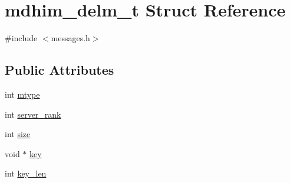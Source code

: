 \hypertarget{structmdhim__delm__t}{\section{mdhim\-\_\-delm\-\_\-t Struct Reference}
\label{structmdhim__delm__t}
}


{\ttfamily \#include $<$messages.\-h$>$}

\subsection*{Public Attributes}
\begin{DoxyCompactItemize}
\item 
int \hyperlink{structmdhim__delm__t_aed97225c8df041600c6b5fffb43a1bbc}{mtype}
\item 
int \hyperlink{structmdhim__delm__t_a00480044a106cf24c63e03b3d15320dc}{server\-\_\-rank}
\item 
int \hyperlink{structmdhim__delm__t_a72a3a5a840b005517685ab4a5f9e101e}{size}
\item 
void $\ast$ \hyperlink{structmdhim__delm__t_acedac9daad7ab8b9870f8c7c2a471ced}{key}
\item 
int \hyperlink{structmdhim__delm__t_aed818ed56728fe40acd3567fce5a2fb5}{key\-\_\-len}
\end{DoxyCompactItemize}


